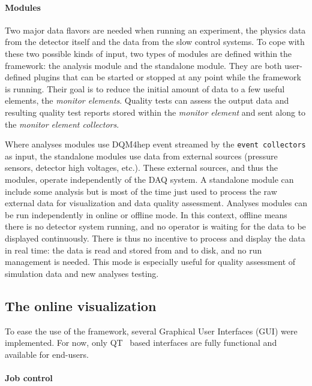 \documentclass{webofc}
\begin{document}
\paragraph{Modules}\label{par:Modules}
Two major data flavors are needed when running an experiment, the physics data from the detector itself and the data from the slow control systems.
To cope with these two possible kinds of input, two types of modules are defined within the framework: the analysis module and the standalone module.
They are both user-defined plugins that can be started or stopped at any point while the framework is running.
Their goal is to reduce the initial amount of data to a few useful elements, the \textit{monitor elements}.
Quality tests can assess the output data and resulting quality test reports stored within the \textit{monitor element} and sent along to the \textit{monitor element collectors}.

Where analyses modules use DQM4hep event streamed by the \texttt{event collectors} as input, the standalone modules use data from external sources (pressure sensors, detector high voltages, etc.).
These external sources, and thus the modules, operate independently of the DAQ system.
A standalone module can include some analysis but is most of the time just used to process the raw external data for visualization and data quality assessment.
Analyses modules can be run independently in online or offline mode.
In this context, offline means there is no detector system running, and no operator is waiting for the data to be displayed continuously.
There is thus no incentive to process and display the data in real time: the data is read and stored from and to disk, and no run management is needed.
This mode is especially useful for quality assessment of simulation data and new analyses testing.

\subsection{The online visualization}
\label{subsec:vis}

To ease the use of the framework, several Graphical User Interfaces (GUI) were implemented.
For now, only QT~\cite{QT} based interfaces are fully functional and available for end-users.

\paragraph{Job control}\label{par:JobControl}
\end{document}
